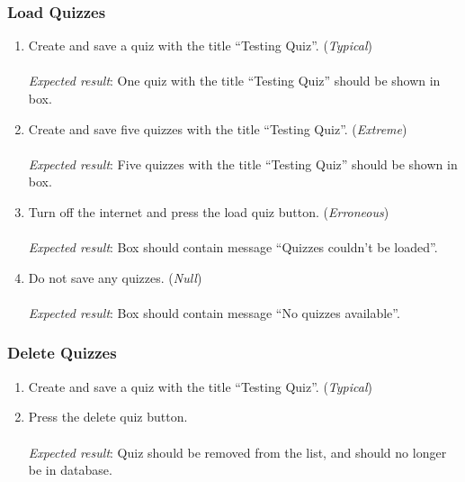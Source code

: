\subsubsection{Load Quizzes} %
\label{ssub:load_quizzes}
\begin{enumerate}[leftmargin=*]
\item Create and save a quiz with the title ``Testing Quiz''. (\textit{Typical})\\\\
\textit{Expected result}: One quiz with the title ``Testing Quiz'' should be shown in box.\\

\item Create and save five quizzes with the title ``Testing Quiz''. (\textit{Extreme})\\\\
\textit{Expected result}: Five quizzes with the title ``Testing Quiz'' should be shown in box.\\

\item Turn off the internet and press the load quiz button. (\textit{Erroneous})\\\\
\textit{Expected result}: Box should contain message ``Quizzes couldn't be loaded''.\\

\item Do not save any quizzes. (\textit{Null})\\\\
\textit{Expected result}: Box should contain message ``No quizzes available''.
\end{enumerate}

\subsubsection{Delete Quizzes} %
\label{ssub:delete_quizzes}
\begin{enumerate}[leftmargin=*]
\item Create and save a quiz with the title ``Testing Quiz''. (\textit{Typical})
\item Press the delete quiz button.\\\\
\textit{Expected result}: Quiz should be removed from the list, and should no longer be in database.
\end{enumerate}

